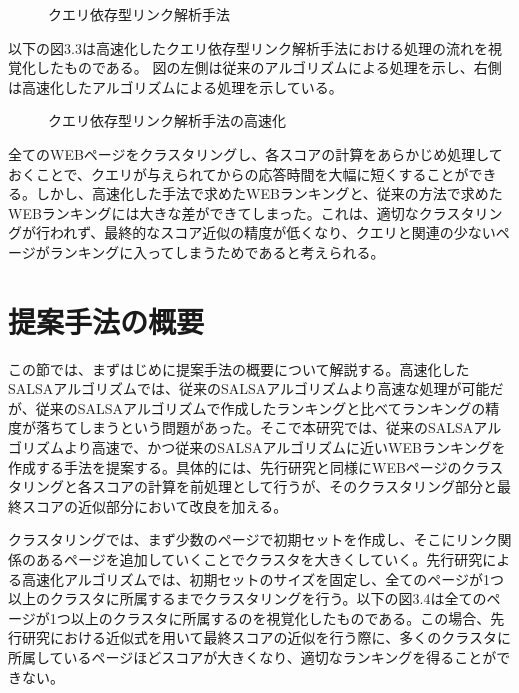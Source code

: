 \documentclass[a4paper,11pt]{jreport}
\begin{document}
\begin{figure}[htbp]
\begin{center}
\end{center}
\caption{クエリ依存型リンク解析手法}
\label{figure:sample}
\end{figure}

以下の図3.3は高速化したクエリ依存型リンク解析手法における処理の流れを視覚化したものである。
図の左側は従来のアルゴリズムによる処理を示し、右側は高速化したアルゴリズムによる処理を示している。

\begin{figure}[htbp]
\begin{center}
\end{center}
\caption{クエリ依存型リンク解析手法の高速化}
\label{figure:sample}
\end{figure}

全てのWEBページをクラスタリングし、各スコアの計算をあらかじめ処理しておくことで、クエリが与えられてからの応答時間を大幅に短くすることができる。しかし、高速化した手法で求めたWEBランキングと、従来の方法で求めたWEBランキングには大きな差ができてしまった。これは、適切なクラスタリングが行われず、最終的なスコア近似の精度が低くなり、クエリと関連の少ないページがランキングに入ってしまうためであると考えられる。

\newpage

\section{提案手法の概要}

この節では、まずはじめに提案手法の概要について解説する。高速化したSALSAアルゴリズムでは、従来のSALSAアルゴリズムより高速な処理が可能だが、従来のSALSAアルゴリズムで作成したランキングと比べてランキングの精度が落ちてしまうという問題があった。そこで本研究では、従来のSALSAアルゴリズムより高速で、かつ従来のSALSAアルゴリズムに近いWEBランキングを作成する手法を提案する。具体的には、先行研究と同様にWEBページのクラスタリングと各スコアの計算を前処理として行うが、そのクラスタリング部分と最終スコアの近似部分において改良を加える。

クラスタリングでは、まず少数のページで初期セットを作成し、そこにリンク関係のあるページを追加していくことでクラスタを大きくしていく。先行研究による高速化アルゴリズムでは、初期セットのサイズを固定し、全てのページが1つ以上のクラスタに所属するまでクラスタリングを行う。以下の図3.4は全てのページが1つ以上のクラスタに所属するのを視覚化したものである。この場合、先行研究における近似式を用いて最終スコアの近似を行う際に、多くのクラスタに所属しているページほどスコアが大きくなり、適切なランキングを得ることができない。
\end{document}
